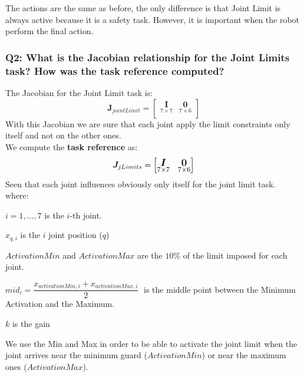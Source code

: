 \documentclass{article}
\begin{document}
The actions are the same as before, the only difference is that Joint Limit is always active because it is a safety task. However, it is important when the robot perform the final action. 

\subsubsection{Q2: What is the Jacobian relationship for the Joint Limits task? How was the task reference computed?}
The Jacobian for the Joint Limit task is:
\begin{equation}
\boldsymbol{J}_{jointLimit}=
    \begin{bmatrix}
     \underset{7\times 7}{\boldsymbol{I}} & \underset{7\times6}{\boldsymbol{0}} \\
    \end{bmatrix}
\end{equation}
With this Jacobian we are sure that each joint apply the limit constraints only itself and not on the other ones.
\\
We compute the \textbf{task reference} as:
\begin{equation}
\large
\boldsymbol{J}_{jLimits} =
\begin{bmatrix}
\underset{7\times7}{\boldsymbol{I}} & \underset{7\times6}{\boldsymbol{0}}
\end{bmatrix}
\end{equation}
	Seen that each joint influences obviously only itself for the joint limit task.\\
	

	where:
	\begin{description}
		\item $i = 1,\dots,7$ is the $i$-th joint.
		\item $x_{q,i}$ is the $i$ joint position ($q$)
		\item $ActivationMin$ and $ActivationMax$ are the $10\%$ of the limit imposed for each joint.
		\item $mid_i = \dfrac{x_{activationMin,i} + x_{activationMax,i}}{2}\; $ is the middle point between the Minimum Activation and the Maximum.
		\item $k$ is the gain
\end{description}
We use the Min and Max in order to be able to activate the joint limit when the joint arrives near the minimum guard ($ActivationMin$) or near the maximum ones ($ActivationMax$).
\clearpage
\end{document}
